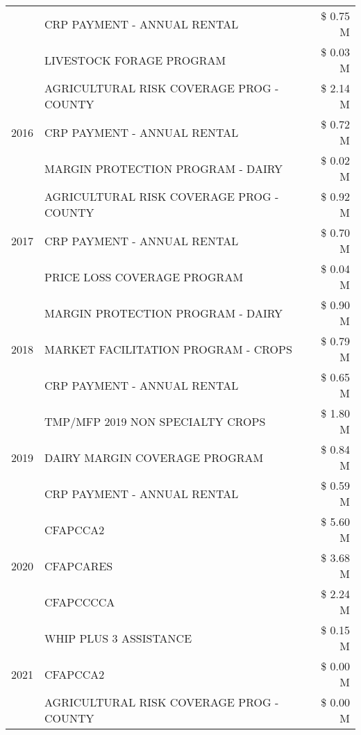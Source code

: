 \begin{tabular}{llr}
 & CRP PAYMENT - ANNUAL RENTAL & \$ 0.75 M \\
 & LIVESTOCK FORAGE PROGRAM & \$ 0.03 M \\
\cline{1-3}
\multirow[t]{3}{*}{2016} & AGRICULTURAL RISK COVERAGE PROG - COUNTY & \$ 2.14 M \\
 & CRP PAYMENT - ANNUAL RENTAL & \$ 0.72 M \\
 & MARGIN PROTECTION PROGRAM - DAIRY & \$ 0.02 M \\
\cline{1-3}
\multirow[t]{3}{*}{2017} & AGRICULTURAL RISK COVERAGE PROG - COUNTY & \$ 0.92 M \\
 & CRP PAYMENT - ANNUAL RENTAL & \$ 0.70 M \\
 & PRICE LOSS COVERAGE PROGRAM & \$ 0.04 M \\
\cline{1-3}
\multirow[t]{3}{*}{2018} & MARGIN PROTECTION PROGRAM - DAIRY & \$ 0.90 M \\
 & MARKET FACILITATION PROGRAM - CROPS & \$ 0.79 M \\
 & CRP PAYMENT - ANNUAL RENTAL & \$ 0.65 M \\
\cline{1-3}
\multirow[t]{3}{*}{2019} & TMP/MFP 2019 NON SPECIALTY CROPS & \$ 1.80 M \\
 & DAIRY MARGIN COVERAGE PROGRAM & \$ 0.84 M \\
 & CRP PAYMENT - ANNUAL RENTAL & \$ 0.59 M \\
\cline{1-3}
\multirow[t]{3}{*}{2020} & CFAPCCA2 & \$ 5.60 M \\
 & CFAPCARES & \$ 3.68 M \\
 & CFAPCCCCA & \$ 2.24 M \\
\cline{1-3}
\multirow[t]{3}{*}{2021} & WHIP PLUS 3 ASSISTANCE & \$ 0.15 M \\
 & CFAPCCA2 & \$ 0.00 M \\
 & AGRICULTURAL RISK COVERAGE PROG - COUNTY & \$ 0.00 M \\
\cline{1-3}
\bottomrule
\end{tabular}
